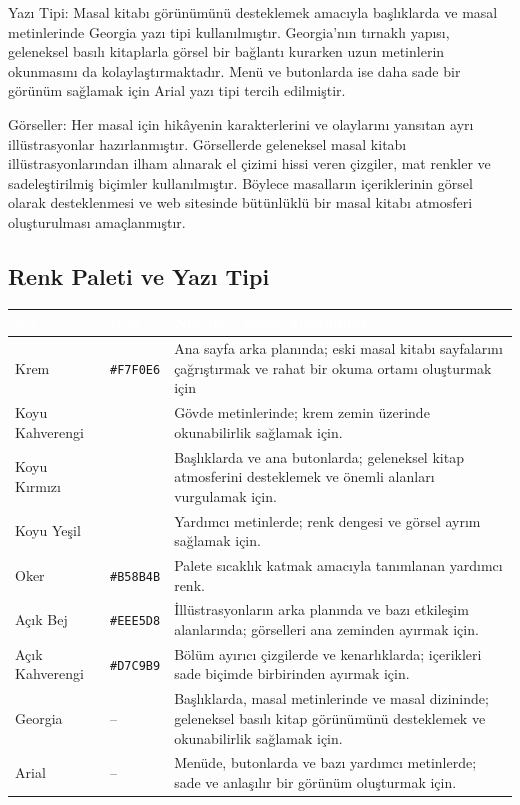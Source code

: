 \documentclass[12pt,a4paper]{article}
\begin{document}
Yazı Tipi: Masal kitabı görünümünü desteklemek amacıyla başlıklarda ve masal metinlerinde Georgia yazı tipi kullanılmıştır. Georgia'nın tırnaklı yapısı, geleneksel basılı kitaplarla görsel bir bağlantı kurarken uzun metinlerin okunmasını da kolaylaştırmaktadır. Menü ve butonlarda ise daha sade bir görünüm sağlamak için Arial yazı tipi tercih edilmiştir.

Görseller: Her masal için hikâyenin karakterlerini ve olaylarını yansıtan ayrı illüstrasyonlar hazırlanmıştır. Görsellerde geleneksel masal kitabı illüstrasyonlarından ilham alınarak el çizimi hissi veren çizgiler, mat renkler ve sadeleştirilmiş biçimler kullanılmıştır. Böylece masalların içeriklerinin görsel olarak desteklenmesi ve web sitesinde bütünlüklü bir masal kitabı atmosferi oluşturulması amaçlanmıştır.

\subsection{Renk Paleti ve Yazı Tipi}
\begin{center}
\begin{tabular}{@{}llp{6.4cm}@{}}
\toprule
\rowcolor{ana}\textcolor{white}{\textbf{Ad}} & \textcolor{white}{\textbf{Kod}} & \textcolor{white}{\textbf{Nerede / neden kullandınız?}} \\
\midrule
\relax Krem & \texttt{#F7F0E6} & Ana sayfa arka planında; eski masal kitabı sayfalarını çağrıştırmak ve rahat bir okuma ortamı oluşturmak için \\
\relax Koyu Kahverengi & \texttt{#2C2521} & Gövde metinlerinde; krem zemin üzerinde okunabilirlik sağlamak için. \\
\relax Koyu Kırmızı & \texttt{#7A302B} & Başlıklarda ve ana butonlarda; geleneksel kitap atmosferini desteklemek ve önemli alanları vurgulamak için. \\
\relax Koyu Yeşil& \texttt{#31544C} & Yardımcı metinlerde; renk dengesi ve görsel ayrım sağlamak için.\\
\relax Oker & \texttt{#B58B4B} & Palete sıcaklık katmak amacıyla tanımlanan yardımcı renk. \\
\relax Açık Bej & \texttt{#EEE5D8} & İllüstrasyonların arka planında ve bazı etkileşim alanlarında; görselleri ana zeminden ayırmak için. \\
\relax Açık Kahverengi & \texttt{#D7C9B9} & Bölüm ayırıcı çizgilerde ve kenarlıklarda; içerikleri sade biçimde birbirinden ayırmak için. \\
\relax Georgia & -- & Başlıklarda, masal metinlerinde ve masal dizininde; geleneksel basılı kitap görünümünü desteklemek ve okunabilirlik sağlamak için. \\
\relax Arial& -- & Menüde, butonlarda ve bazı yardımcı metinlerde; sade ve anlaşılır bir görünüm oluşturmak için. \\
\bottomrule
\end{tabular}
\end{center}
\end{document}
